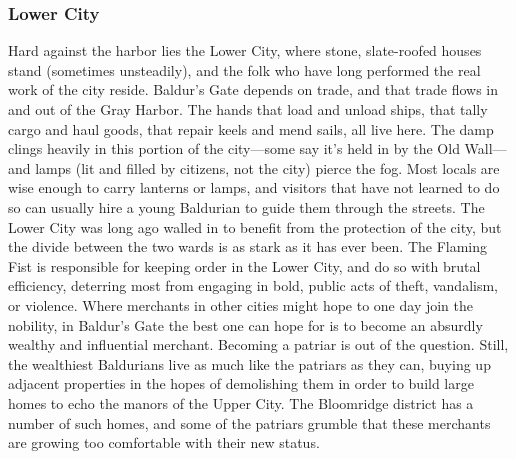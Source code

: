 \documentclass[10pt,a4paper,twoside,twocolumn,openany,bg=print,nodeprecatedcode]{dndbook}
\begin{document}
\subsubsection{Lower City}
Hard against the harbor lies the Lower City, where stone, slate-roofed houses stand (sometimes unsteadily), and the folk who have long performed the real work of the city reside. Baldur's Gate depends on trade, and that trade flows in and out of the Gray Harbor. The hands that load and unload ships, that tally cargo and haul goods, that repair keels and mend sails, all live here. The damp clings heavily in this portion of the city—some say it's held in by the Old Wall—and lamps (lit and filled by citizens, not the city) pierce the fog. Most locals are wise enough to carry lanterns or lamps, and visitors that have not learned to do so can usually hire a young Baldurian to guide them through the streets.
The Lower City was long ago walled in to benefit from the protection of the city, but the divide between the two wards is as stark as it has ever been. The Flaming Fist is responsible for keeping order in the Lower City, and do so with brutal efficiency, deterring most from engaging in bold, public acts of theft, vandalism, or violence.
Where merchants in other cities might hope to one day join the nobility, in Baldur's Gate the best one can hope for is to become an absurdly wealthy and influential merchant. Becoming a patriar is out of the question. Still, the wealthiest Baldurians live as much like the patriars as they can, buying up adjacent properties in the hopes of demolishing them in order to build large homes to echo the manors of the Upper City. The Bloomridge district has a number of such homes, and some of the patriars grumble that these merchants are growing too comfortable with their new status.
\end{document}
